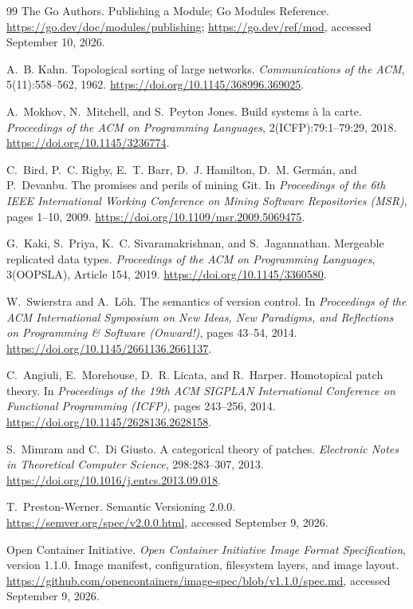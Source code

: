 \begin{thebibliography}{99}
The Go Authors.
Publishing a Module; Go Modules Reference.
\url{https://go.dev/doc/modules/publishing}; \url{https://go.dev/ref/mod},
accessed September 10, 2026.

A.~B. Kahn.
Topological sorting of large networks.
\emph{Communications of the ACM}, 5(11):558--562, 1962.
\url{https://doi.org/10.1145/368996.369025}.

A.~Mokhov, N.~Mitchell, and S.~Peyton Jones.
Build systems \`a la carte.
\emph{Proceedings of the ACM on Programming Languages},
2(ICFP):79:1--79:29, 2018.
\url{https://doi.org/10.1145/3236774}.

C.~Bird, P.~C. Rigby, E.~T. Barr, D.~J. Hamilton, D.~M. Germ\'an, and
P.~Devanbu.
The promises and perils of mining Git.
In \emph{Proceedings of the 6th IEEE International Working Conference
on Mining Software Repositories (MSR)}, pages 1--10, 2009.
\url{https://doi.org/10.1109/msr.2009.5069475}.

G.~Kaki, S.~Priya, K.~C. Sivaramakrishnan, and S.~Jagannathan.
Mergeable replicated data types.
\emph{Proceedings of the ACM on Programming Languages},
3(OOPSLA), Article 154, 2019.
\url{https://doi.org/10.1145/3360580}.

W.~Swierstra and A.~L\"oh.
The semantics of version control.
In \emph{Proceedings of the ACM International Symposium on New Ideas,
New Paradigms, and Reflections on Programming \& Software (Onward!)},
pages 43--54, 2014.
\url{https://doi.org/10.1145/2661136.2661137}.

C.~Angiuli, E.~Morehouse, D.~R. Licata, and R.~Harper.
Homotopical patch theory.
In \emph{Proceedings of the 19th ACM SIGPLAN International Conference
on Functional Programming (ICFP)}, pages 243--256, 2014.
\url{https://doi.org/10.1145/2628136.2628158}.

S.~Mimram and C.~Di Giusto.
A categorical theory of patches.
\emph{Electronic Notes in Theoretical Computer Science}, 298:283--307, 2013.
\url{https://doi.org/10.1016/j.entcs.2013.09.018}.

T.~Preston-Werner.
Semantic Versioning 2.0.0.
\url{https://semver.org/spec/v2.0.0.html}, accessed September 9, 2026.

Open Container Initiative.
\emph{Open Container Initiative Image Format Specification}, version 1.1.0.
Image manifest, configuration, filesystem layers, and image layout.
\url{https://github.com/opencontainers/image-spec/blob/v1.1.0/spec.md},
accessed September 9, 2026.


\end{thebibliography}
